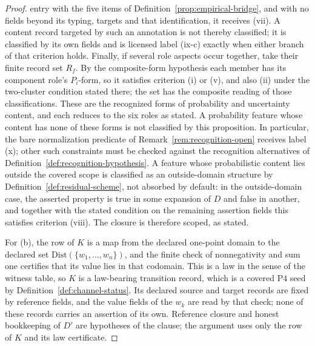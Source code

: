 \documentclass[11pt]{article}
\theoremstyle{definition}
\newcommand{\Pfour}{\ensuremath{\mathrm{P4}}}
\begin{document}
\begin{proof}
entry with the five items of Definition~\ref{prop:empirical-bridge}, and with
no fields beyond its typing, targets and that identification, it
receives (vii). A content record targeted by such an annotation is not thereby classified; it is classified by its own fields and is licensed label (ix-c) exactly when either branch of that criterion holds. Finally, if several role aspects occur together, take their finite
record set \(R_f\). By the composite-form hypothesis each member has
its component role's \(P_i\)-form, so it satisfies criterion (i) or (v), and
also (ii) under the two-cluster condition stated there;
the set has the composite reading of those classifications. These are the recognized forms of probability and uncertainty content, and
each reduces to the six roles as stated. A probability feature whose content
has none of these forms is not classified by this proposition. In particular,
the bare normalization predicate of Remark~\ref{rem:recognition-open} receives
label (x); other such constraints must be checked against the recognition
alternatives of Definition~\ref{def:recognition-hypothesis}.
A feature whose probabilistic content lies outside the covered scope is classified as an outside-domain structure by Definition~\ref{def:residual-scheme}, not absorbed by default: in the outside-domain case, the asserted property is true in some expansion of \(D\) and false in another, and together with the stated condition on the remaining assertion fields this satisfies criterion (viii). The
closure is therefore scoped, as stated.

For (b), the row of \(K\) is a map from the declared one-point
domain to the declared set \(\mathrm{Dist}(\{w_1,\dots,w_n\})\), and the finite
check of nonnegativity and sum one certifies that its value lies in that
codomain. This is a law in the sense of the witness table, so \(K\) is a
law-bearing transition record, which is a covered \Pfour{} seed by
Definition~\ref{def:channel-status}. Its declared source and target records are fixed by reference fields, and the
value fields of the \(w_k\) are read by that check; none of these records carries
an assertion of its own.
Reference closure and honest bookkeeping of \(D'\) are hypotheses of the
clause; the argument uses only the row of \(K\) and its law certificate.
\end{proof}
\end{document}
